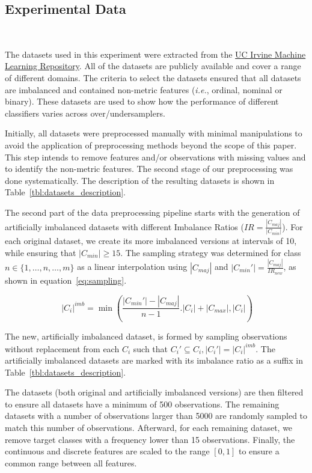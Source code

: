 \documentclass[preprint,12pt]{elsarticle}
\begin{document}
{\subsection{Experimental Data}~\label{sec:experimental_data}

The datasets used in this experiment were extracted from the
\href{https://archive.ics.uci.edu}{UC Irvine Machine Learning Repository}. All
of the datasets are publicly available and cover a range of different domains.
The criteria to select the datasets ensured that all datasets are imbalanced
and contained non-metric features (\textit{i.e.}, ordinal, nominal or binary).
These datasets are used to show how the performance of different
classifiers varies across over/undersamplers.

Initially, all datasets were preprocessed manually with minimal manipulations
to avoid the application of preprocessing methods beyond the scope of this
paper. This step intends to remove features and/or observations with missing
values and to identify the non-metric features. The second stage of our
preprocessing was done systematically. The description of the resulting
datasets is shown in Table~\ref{tbl:datasets_description}.



The second part of the data preprocessing pipeline starts with the generation
of artificially imbalanced datasets with different Imbalance Ratios
($IR=\frac{|C_{maj}|}{|C_{min}|}$). For each original dataset, we create its
more imbalanced versions at intervals of 10, while ensuring that $|C_{min}|
\ge 15$. The sampling strategy was determined for class $n \in
\{1,\ldots,n,\ldots,m\}$ as a linear interpolation using $|C_{maj}|$ and
$|C_{min}'|=\frac{|C_{maj}|}{IR_{new}}$, as shown in
equation~\ref{eq:sampling}.

\begin{equation}~\label{eq:sampling}
    |C_i|^{imb} =
    \min(\frac{|C_{min}'|-|C_{maj}|}{n-1}.|C_i|+|C_{max}|, |C_i|)
\end{equation}

The new, artificially imbalanced dataset, is formed by sampling observations
without replacement from each $C_i$ such that $C_i' \subseteq C_i , |C_i'| =
|C_i|^{imb}$. The artificially imbalanced datasets are marked with its
imbalance ratio as a suffix in Table~\ref{tbl:datasets_description}.

The datasets (both original and artificially imbalanced versions) are then
filtered to ensure all datasets have a minimum of 500 observations.  The
remaining datasets with a number of observations larger than 5000 are randomly
sampled to match this number of observations. Afterward, for each remaining
dataset, we remove target classes with a frequency lower than 15 observations.
Finally, the continuous and discrete features are scaled to the range $[0,1]$
to ensure a common range between all features. 

}
\end{document}
